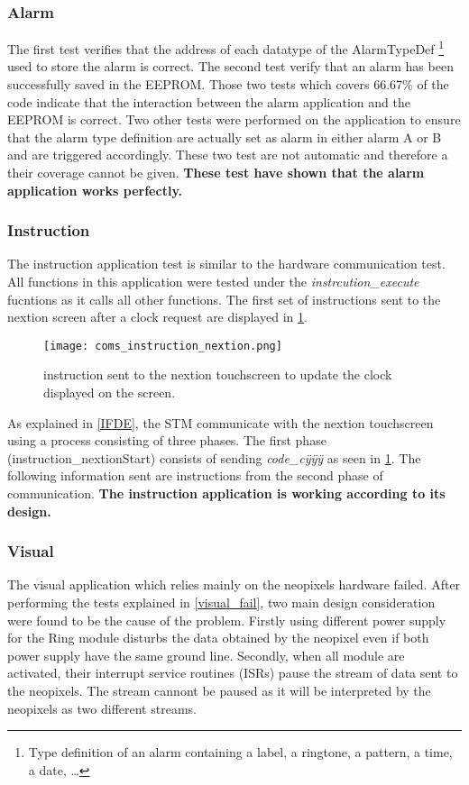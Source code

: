 \subsubsection{Alarm}
The first test verifies that the address of each datatype of the AlarmTypeDef \footnote{Type definition of an alarm containing a label, a ringtone, a pattern, a time, a date, \ldots} used to store the alarm is correct. The second test verify that an alarm has been successfully saved in the EEPROM. Those two tests which covers 66.67\% of the code indicate that the interaction between the alarm application and the EEPROM is correct. Two other tests were performed on the application to ensure that the alarm type definition are actually set as alarm in either alarm A or B and are triggered accordingly. These two test are not automatic and therefore a their coverage cannot be given. \textbf{These test have shown that the alarm application works perfectly.}
  
\subsubsection{Instruction}
The instruction application test is similar to the hardware communication test. All functions in this application were tested under the \textit{instrcution\_execute} fucntions as it calls all other functions. The first set of instructions sent to the nextion screen after a clock request are displayed in \cref{fig:coms_instruction_nextion}.
\begin{figure}[ht]
	\centering
	\texttt{[image: coms\_instruction\_nextion.png]}
	\caption{instruction sent to the nextion touchscreen to update the clock displayed on the screen.}
	\label{fig:coms_instruction_nextion}
\end{figure}
As explained in \ref{IFDE}, the STM communicate with the nextion touchscreen using a process consisting of three phases. The first phase (instruction\_nextionStart) consists of sending \textit{code\_c\"{y}\"{y}\"{y}} as seen in \cref{fig:coms_instruction_nextion}. The following information sent are instructions from the second phase of communication. \textbf{The instruction application is working according to its design.}

\subsubsection{Visual}
The visual application which relies mainly on the neopixels hardware failed. After performing the tests explained in \ref{visual_fail}, two main design consideration were found to be the cause of the problem. Firstly using different power supply for the Ring module disturbs the data obtained by the neopixel even if both power supply have the same ground line. Secondly, when all module are activated, their interrupt service routines (ISRs) pause the stream of data sent to the neopixels. The stream cannont be paused as it will be interpreted by the neopixels as two different streams. 
 
